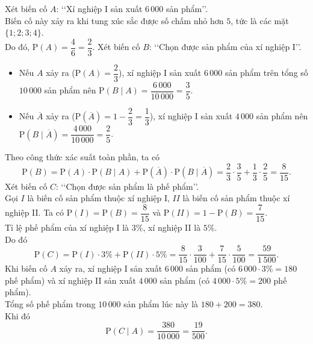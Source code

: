 \begin{ex}
{\begin{center}
		\end{center}
		\begin{itemchoice}
			\itemch Xét biến cố $A$: \lq\lq Xí nghiệp I sản xuất $6\,000$ sản phẩm\rq\rq.\\ 
			Biến cố này xảy ra khi tung xúc sắc được số chấm nhỏ hơn $5$, tức là các mặt $\{1; 2; 3; 4\}$. \\
			Do đó, $\mathrm{P}(A) = \dfrac{4}{6} = \dfrac{2}{3}$.
			\itemch Xét biến cố $B$: \lq\lq Chọn được sản phẩm của xí nghiệp I\rq\rq.
			\begin{itemize}
				\item Nếu $A$ xảy ra ($\mathrm{P}(A) = \dfrac{2}{3}$), xí nghiệp I sản xuất $6\,000$ sản phẩm trên tổng số $10\,000$ sản phẩm nên $\mathrm{P}(B \mid A) = \dfrac{6\,000}{10\,000} = \dfrac{3}{5}$.
				\item Nếu $\overline{A}$ xảy ra ($\mathrm{P}(\overline{A}) = 1 - \dfrac{2}{3} = \dfrac{1}{3}$), xí nghiệp I sản xuất $4\,000$ sản phẩm nên $\mathrm{P}(B \mid \overline{A}) = \dfrac{4\,000}{10\,000} = \dfrac{2}{5}$.
			\end{itemize}
			Theo công thức xác suất toàn phần, ta có
			\[\mathrm{P}(B) = \mathrm{P}(A) \cdot \mathrm{P}(B \mid A) + \mathrm{P}(\overline{A}) \cdot \mathrm{P}(B \mid \overline{A}) = \dfrac{2}{3} \cdot \dfrac{3}{5} + \dfrac{1}{3} \cdot \dfrac{2}{5} = \dfrac{8}{15}.\]
			\itemch Xét biến cố $C$: \lq\lq Chọn được sản phẩm là phế phẩm\rq\rq. \\
			Gọi $I$ là biến cố sản phẩm thuộc xí nghiệp I, $II$ là biến cố sản phẩm thuộc xí nghiệp II. Ta có $\mathrm{P}(I) = \mathrm{P}(B) = \dfrac{8}{15}$ và $\mathrm{P}(II) = 1 - \mathrm{P}(B) = \dfrac{7}{15}$. \\
			Tỉ lệ phế phẩm của xí nghiệp I là $3\%$, xí nghiệp II là $5\%$.\\
			Do đó
			\[\mathrm{P}(C) = \mathrm{P}(I) \cdot 3\% + \mathrm{P}(II) \cdot 5\% = \dfrac{8}{15} \cdot \dfrac{3}{100} + \dfrac{7}{15} \cdot \dfrac{5}{100} = \dfrac{59}{1\,500}.\]
			\itemch Khi biến cố $A$ xảy ra, xí nghiệp I sản xuất $6\,000$ sản phẩm (có $6\,000 \cdot 3\% = 180$ phế phẩm) và xí nghiệp II sản xuất $4\,000$ sản phẩm (có $4\,000 \cdot 5\% = 200$ phế phẩm). \\
			Tổng số phế phẩm trong $10\,000$ sản phẩm lúc này là $180 + 200 = 380$.\\ 
			Khi đó
			\[\mathrm{P}(C \mid A) = \dfrac{380}{10\,000} = \dfrac{19}{500}.\]
		\end{itemchoice}
	}
\end{ex}

